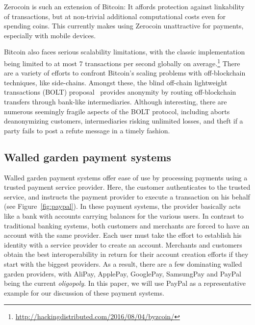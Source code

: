 \documentclass{llncs}
\begin{document}
Zerocoin \cite{miers2013zerocoin} is such an extension of Bitcoin:
It affords protection against linkability of transactions,
but at non-trivial additional computational costs even for
spending coins.  This currently makes using Zerocoin unattractive
for payments, especially with mobile devices.

Bitcoin also faces serious scalability limitations, with the classic
implementation being limited to at most 7 transactions per second
globally on
average.\footnote{\url{http://hackingdistributed.com/2016/08/04/byzcoin/}}
There are a variety of efforts to confront Bitcoin's scaling problems
with off-blockchain techniques, like side-chains. %
Amongst these, the blind off-chain lightweight transactions (BOLT)
proposal~\cite{BOLT} provides anonymity by routing off-blockchain
transfers through bank-like intermediaries.  Although interesting,
there are numerous seemingly fragile aspects of the BOLT protocol,
including aborts deanonymizing customers, intermediaries risking
unlimited losses, and theft if a party fails to post a refute message
in a timely fashion.




\subsection{Walled garden payment systems}

Walled garden payment systems offer ease of use by processing payments
using a trusted payment service provider. Here, the customer
authenticates to the trusted service, and instructs the payment
provider to execute a transaction on his behalf
(see Figure~\ref{fig:paypal}).  In these payment systems, the provider
basically acts like a bank with accounts carrying balances for the
various users.  In contrast to traditional banking systems, both
customers and merchants are forced to have an account with the same
provider.  Each user must take the effort to establish his identity
with a service provider to create an account.  Merchants and customers
obtain the best interoperability in return for their account creation
efforts if they start with the biggest providers.  As a result, there
are a few dominating walled garden providers, with AliPay, ApplePay,
GooglePay, SamsungPay and PayPal being the current {\em oligopoly}.  In this
paper, we will use PayPal as a representative example for our discussion
of these payment systems.
\end{document}
